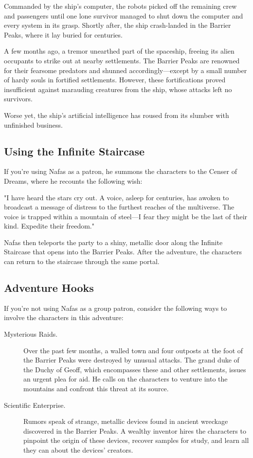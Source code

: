 \documentclass[10pt,a4paper,twoside,bg=print,twocolumn,openany,nodeprecatedcode]{dndbook}
\begin{document}
Commanded by the ship's computer, the robots picked off the remaining crew and passengers until one lone survivor managed to shut down the computer and every system in its grasp. Shortly after, the ship crash-landed in the Barrier Peaks, where it lay buried for centuries.

A few months ago, a tremor unearthed part of the spaceship, freeing its alien occupants to strike out at nearby settlements. The Barrier Peaks are renowned for their fearsome predators and shunned accordingly—except by a small number of hardy souls in fortified settlements. However, these fortifications proved insufficient against marauding creatures from the ship, whose attacks left no survivors.

Worse yet, the ship's artificial intelligence has roused from its slumber with unfinished business.

\subsection{Using the Infinite Staircase}
If you're using Nafas as a patron, he summons the characters to the Censer of Dreams, where he recounts the following wish:

\begin{DndReadAloud}{}
"I have heard the stars cry out. A voice, asleep for centuries, has awoken to broadcast a message of distress to the furthest reaches of the multiverse. The voice is trapped within a mountain of steel—I fear they might be the last of their kind. Expedite their freedom."

\end{DndReadAloud}

Nafas then teleports the party to a shiny, metallic door along the Infinite Staircase that opens into the Barrier Peaks. After the adventure, the characters can return to the staircase through the same portal.

\subsection{Adventure Hooks}
If you're not using Nafas as a group patron, consider the following ways to involve the characters in this adventure:


\begin{description}
\item[Mysterious Raids.]
Over the past few months, a walled town and four outposts at the foot of the Barrier Peaks were destroyed by unusual attacks. The grand duke of the Duchy of Geoff, which encompasses these and other settlements, issues an urgent plea for aid. He calls on the characters to venture into the mountains and confront this threat at its source.
\item[Scientific Enterprise.]
Rumors speak of strange, metallic devices found in ancient wreckage discovered in the Barrier Peaks. A wealthy inventor hires the characters to pinpoint the origin of these devices, recover samples for study, and learn all they can about the devices' creators.
\end{description}
\end{document}
